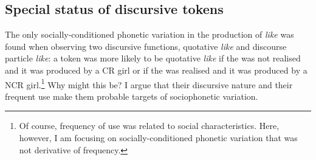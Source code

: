 







\subsection{Special status of discursive tokens}\label{sec:statusofdisc}

The only socially-conditioned phonetic variation in the production of \textit{like} was found when observing two discursive functions, quotative \textit{like} and discourse particle \textit{like}: a token was more likely to be quotative \textit{like} if the  was not realised and it was produced by a CR girl or if the  was realised and it was produced by a NCR girl.\footnote{Of course, frequency of use was related to social characteristics. Here, however, I am focusing on socially-conditioned phonetic variation that was not derivative of frequency.} Why might this be? I argue that their discursive nature and their frequent use make them probable targets of sociophonetic variation.

